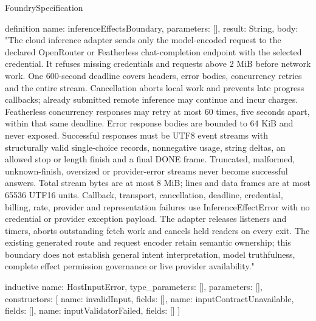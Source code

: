 \begin{lexlean}{FoundrySpecification}
\begin{semanticmodule}
definition{
  name: inferenceEffectsBoundary,
  parameters: [],
  result: String,
  body: "The cloud inference adapter sends only the model-encoded request to the declared OpenRouter or Featherless chat-completion endpoint with the selected credential. It refuses missing credentials and requests above 2 MiB before network work. One 600-second deadline covers headers, error bodies, concurrency retries and the entire stream. Cancellation aborts local work and prevents late progress callbacks; already submitted remote inference may continue and incur charges. Featherless concurrency responses may retry at most 60 times, five seconds apart, within that same deadline. Error response bodies are bounded to 64 KiB and never exposed. Successful responses must be UTF8 event streams with structurally valid single-choice records, nonnegative usage, string deltas, an allowed stop or length finish and a final DONE frame. Truncated, malformed, unknown-finish, oversized or provider-error streams never become successful answers. Total stream bytes are at most 8 MiB; lines and data frames are at most 65536 UTF16 units. Callback, transport, cancellation, deadline, credential, billing, rate, provider and representation failures use InferenceEffectError with no credential or provider exception payload. The adapter releases listeners and timers, aborts outstanding fetch work and cancels held readers on every exit. The existing generated route and request encoder retain semantic ownership; this boundary does not establish general intent interpretation, model truthfulness, complete effect permission governance or live provider availability."
}

inductive{
  name: HostInputError,
  type_parameters: [],
  parameters: [],
  constructors: [
    {name: invalidInput, fields: []},
    {name: inputContractUnavailable, fields: []},
    {name: inputValidatorFailed, fields: []}
  ]
}


\end{semanticmodule}
\end{lexlean}

